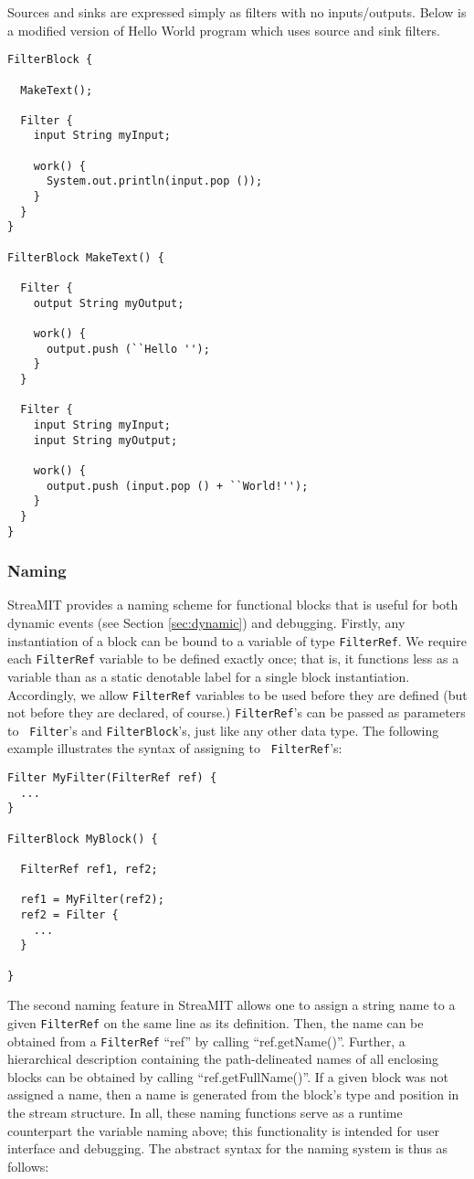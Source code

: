 Sources and sinks are expressed simply as filters with no inputs/outputs.
Below is a modified version of Hello World program which uses source
and sink filters.

\begin{verbatim}
FilterBlock {

  MakeText();

  Filter {
    input String myInput;
    
    work() {
      System.out.println(input.pop ());
    }
  }
}

FilterBlock MakeText() {

  Filter {
    output String myOutput;

    work() {
      output.push (``Hello '');
    }
  }

  Filter {
    input String myInput;
    input String myOutput;

    work() {
      output.push (input.pop () + ``World!'');
    }
  }
}

\end{verbatim}

\subsubsection{Naming}

StreaMIT provides a naming scheme for functional blocks that is useful
for both dynamic events (see Section {\ref{sec:dynamic}}) and
debugging.  Firstly, any instantiation of a block can be bound to a
variable of type {\tt FilterRef}.  We require each {\tt FilterRef}
variable to be defined exactly once; that is, it functions less as a
variable than as a static denotable label for a single block
instantiation.  Accordingly, we allow {\tt FilterRef} variables to be
used before they are defined (but not before they are declared, of
course.)  {\tt FilterRef}'s can be passed as parameters to {\tt
Filter}'s and {\tt FilterBlock}'s, just like any other data type.  The
following example illustrates the syntax of assigning to {\tt
FilterRef}'s:

\begin{verbatim}
Filter MyFilter(FilterRef ref) {
  ...
}

FilterBlock MyBlock() {

  FilterRef ref1, ref2;

  ref1 = MyFilter(ref2);
  ref2 = Filter {
    ...
  }

}
\end{verbatim}

The second naming feature in StreaMIT allows one to assign a string
name to a given {\tt FilterRef} on the same line as its definition.
Then, the name can be obtained from a {\tt FilterRef} ``ref'' by
calling ``ref.getName()''.  Further, a hierarchical description
containing the path-delineated names of all enclosing blocks can be
obtained by calling ``ref.getFullName()''.  If a given block was not
assigned a name, then a name is generated from the block's type and
position in the stream structure.  In all, these naming functions
serve as a runtime counterpart the variable naming above; this
functionality is intended for user interface and debugging.  The
abstract syntax for the naming system is thus as follows:

